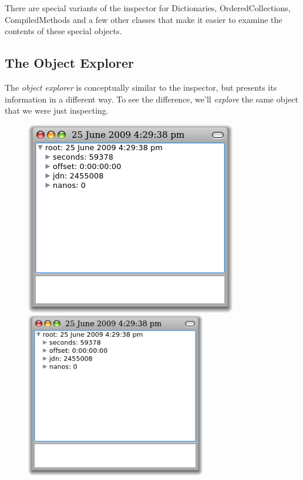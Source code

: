 \documentclass[a4paper,10pt,twoside]{book}
\begin{document}
There are special variants of the inspector for Dictionaries, OrderedCollections, CompiledMethods and a few other classes that make it easier to examine the contents of these special objects.

\subsection{The Object Explorer}

The \emph{object explorer} is conceptually similar to the inspector, but presents its information in a different way.
To see the difference, we'll \emph{explore} the same object that we were just inspecting.

\begin{figure}[tbp]
\begin{minipage}{0.48\textwidth}
	\begin{center}
	\ifluluelse
		{\includegraphics[width=\textwidth]{exploreTimeStampNow}}
		{\includegraphics[width=0.7\textwidth]{exploreTimeStampNow}}

\end{center}
\end{minipage}
\end{figure}
\end{document}
